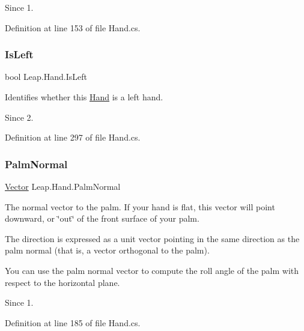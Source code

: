 \begin{DoxySince}{Since}
1. 
\end{DoxySince}


Definition at line 153 of file Hand.\+cs.

\mbox{\label{class_leap_1_1_hand_a783d6adaec7c3f3422e70bba4480b39d}} 
\subsubsection{\texorpdfstring{IsLeft}{IsLeft}}
{\footnotesize\ttfamily bool Leap.\+Hand.\+Is\+Left}



Identifies whether this \mbox{\hyperlink{class_leap_1_1_hand}{Hand}} is a left hand. 

\begin{DoxySince}{Since}
2. 
\end{DoxySince}


Definition at line 297 of file Hand.\+cs.

\mbox{\label{class_leap_1_1_hand_a32586524eb04a8d5b9ed6559285fb1d1}} 
\subsubsection{\texorpdfstring{PalmNormal}{PalmNormal}}
{\footnotesize\ttfamily \mbox{\hyperlink{struct_leap_1_1_vector}{Vector}} Leap.\+Hand.\+Palm\+Normal}



The normal vector to the palm. If your hand is flat, this vector will point downward, or \char`\"{}out\char`\"{} of the front surface of your palm. 

The direction is expressed as a unit vector pointing in the same direction as the palm normal (that is, a vector orthogonal to the palm).

You can use the palm normal vector to compute the roll angle of the palm with respect to the horizontal plane. \begin{DoxySince}{Since}
1. 
\end{DoxySince}


Definition at line 185 of file Hand.\+cs.

\mbox{\label{class_leap_1_1_hand_aaf0940b9108e92c22e33b9c6cd32921a}} 
